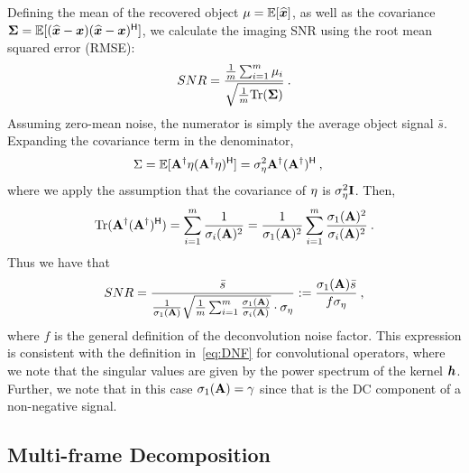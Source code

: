 Defining the mean of the recovered object $\mu = \mathbb{E}[\widehat {\bm{x}}]$, as well as the covariance $\mathbf\Sigma = \mathbb{E}[(\widehat {\bm{x}}-\bm{x}) (\widehat {\bm{x}}-\bm{x})^{\mathsf{H}}]$, we calculate the imaging SNR using the root mean squared error (RMSE):
\[SNR = \frac{\frac{1}{m}\sum_{i=1}^m\mu_i}{\sqrt{\frac{1}{m}\mathrm{Tr}(\mathbf\Sigma)}}\:.\]
Assuming zero-mean noise, the numerator is simply the average object signal $\bar s$.
Expanding the covariance term in the denominator,
\begin{align*}
    \Sigma &= \mathbb{E}[ \mathbf{A}^\dagger  {\eta}( \mathbf{A}^\dagger  {\eta})^{\mathsf{H}}]
    = \sigma_{ {\eta}}^2  \mathbf{A}^\dagger ( \mathbf{A}^\dagger)^{\mathsf{H}}\:,
\end{align*}
where we apply the assumption that the covariance of ${\eta}$ is $\sigma_{\eta}^2 \mathbf{I}$. Then,
\[\mathrm{Tr}( \mathbf{A}^\dagger ( \mathbf{A}^\dagger)^{\mathsf{H}} ) = \sum_{i=1}^m \frac{1}{\sigma_i( \mathbf{A})^2} = \frac{1}{\sigma_1(\mathbf{A})^2} \sum_{i=1}^m \frac{\sigma_1(\mathbf{A})^2}{\sigma_i(\mathbf{A})^2} \:.\]
Thus we have that
\[SNR = \frac{\bar s}{\frac{1}{\sigma_1(\mathbf{A})} \sqrt{\frac{1}{m}\sum_{i=1}^m \frac{\sigma_1(\mathbf{A})}{\sigma_i(\mathbf{A})}} \cdot\sigma_\eta} := \frac{\sigma_1(\mathbf{A}) \bar s }{ f\sigma_\eta }\:,\]
where $f$ is the general definition of the deconvolution noise factor. This expression is consistent with the definition in~\eqref{eq:DNF} for convolutional operators, where we note that the singular values are given by the power spectrum of the kernel $\bm{h}$. Further, we note that in this case $\sigma_1(\mathbf{A})=\gamma$ since that is the DC component of a non-negative signal.

\subsection{Multi-frame Decomposition}\label{sec:appendix:multiframe_app}

